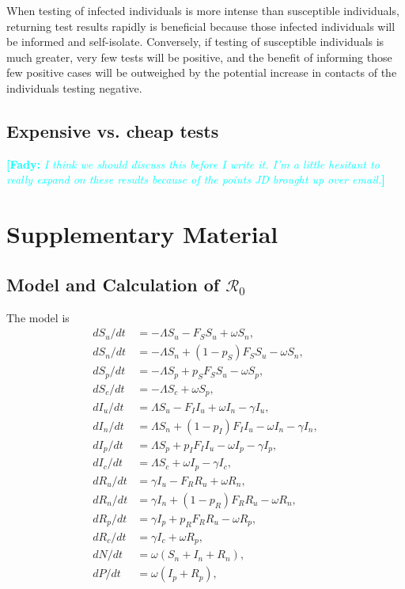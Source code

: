 \documentclass[12pt]{article}
\newcommand{\comment}{\showcomment}
\newcommand{\showcomment}[3]{\textcolor{#1}{\textbf{[#2: }\textsl{#3}\textbf{]}}}
\newcommand{\fady}[1]{\comment{cyan}{Fady}{#1}}
\newcommand{\Rnum}{\mathcal{R}_0}
\theoremstyle{definition} %
\begin{document}
When testing of infected individuals is more intense than susceptible individuals, returning test results rapidly is beneficial because those infected individuals will be informed and self-isolate. Conversely, if testing of susceptible individuals is much greater, very few tests will be positive, and the benefit of informing those few positive cases will be outweighed by the potential increase in contacts of the individuals testing negative. 


\subsection{Expensive vs. cheap tests}
\fady{I think we should discuss this before I write it. I'm a little hesitant to really expand on these results because of the points JD brought up over email.}




\section{Supplementary Material}

\subsection{Model and Calculation of $\Rnum$}

The model is 
\begin{align}
 d S_u/dt &= -\Lambda S_u - F_S S_u + \omega S_n, \label{eq1}\\
 d S_n/dt &= -\Lambda S_n + (1-p_S) F_S S_u - \omega S_n, \label{eq2}\\
 d S_p/dt &= -\Lambda S_p + p_S F_S S_u - \omega S_p, \label{eq3}\\
 d S_c/dt &= -\Lambda S_c + \omega S_p, \label{eq4}\\
 d I_u/dt &= \Lambda S_u - F_I I_u + \omega I_n  - \gamma I_u,  \label{eq5}\\
 d I_n/dt &= \Lambda S_n + (1-p_I) F_I I_u - \omega I_n -\gamma I_n, \label{eq6}\\
 d I_p/dt &= \Lambda S_p + p_I F_I I_u - \omega I_p -\gamma I_p, \label{eq7}\\
 d I_c/dt &= \Lambda S_c + \omega I_p - \gamma I_c,  \label{eq8}\\
 d R_u/dt &= \gamma I_u - F_R R_u + \omega R_n, \label{eq9}\\
 d R_n/dt &= \gamma I_n + (1-p_R) F_R R_u - \omega R_n,  \label{eq10}\\
 d R_p/dt &= \gamma I_p + p_R F_R R_u  - \omega R_p,  \label{eq11}\\
 d R_c/dt&= \gamma I_c + \omega R_p,  \label{eq12}\\
 dN/dt &= \omega (S_n + I_n + R_n),   \label{eq13}\\
 dP/dt &= \omega(I_p + R_p) \label{eq14},
\end{align}
\end{document}
